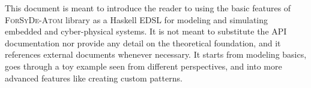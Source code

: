 This document is meant to introduce the reader to using the basic features of \textsc{ForSyDe-Atom} library as a Haskell EDSL for modeling and simulating embedded and cyber-physical systems. It is not meant to substitute the API documentation nor provide any detail on the theoretical foundation, and it references external documents whenever necessary. It starts from modeling basics, goes through a toy example seen from different perspectives, and into more advanced features like creating custom patterns.